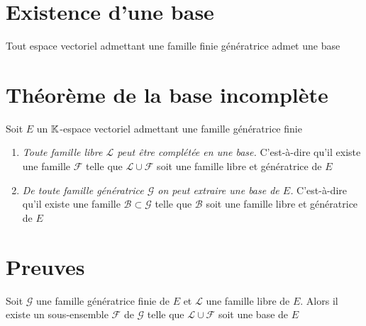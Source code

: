 \section{Existence d'une base}

\begin{frame}

\begin{theoreme}
Tout espace vectoriel admettant une famille finie génératrice
admet une base
\end{theoreme}


\end{frame}



\section{Théorème de la base incomplète}

\begin{frame}
\begin{theoreme}
Soit $E$ un $\mathbb{K}$-espace vectoriel admettant une famille génératrice finie

\pause
\begin{enumerate}
  \item \emph{Toute famille libre $\mathcal{L}$ peut être complétée en une base.}
  C'est-à-dire qu'il existe une famille $\mathcal{F}$ telle que 
  $\mathcal{L} \cup \mathcal{F}$ soit une famille libre et génératrice de $E$
  
  \pause
  \item \emph{De toute famille génératrice $\mathcal{G}$ on peut extraire une base de $E$.}
  C'est-à-dire qu'il existe une famille $\mathcal{B} \subset \mathcal{G}$ telle que 
  $\mathcal{B}$ soit une famille libre et génératrice de $E$
\end{enumerate}
\end{theoreme}



\end{frame}





\section{Preuves}

\begin{frame}
\begin{theoreme}
\label{th:superbaseincomplete}
Soit $\mathcal{G}$ une famille génératrice finie de $E$ 
et $\mathcal{L}$ une famille libre de $E$. 
Alors il existe un sous-ensemble $\mathcal{F}$ de $\mathcal{G}$ telle que
$\mathcal{L} \cup \mathcal{F}$ soit une base de $E$
\end{theoreme}
\end{frame}





